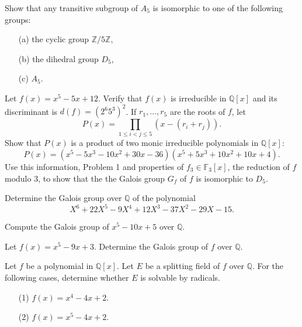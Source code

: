 \begin{prob}[S2019-Q1]
    Show that any transitive subgroup of \(A_{5}\) is isomorphic to one of the following groups:
    \begin{itemize}
        \item[(a)] the cyclic group \(\mathbb{Z}/5\mathbb{Z}\),
        \item[(b)] the dihedral group \(D_{5}\),
        \item[(c)] \(A_{5}\).
    \end{itemize}
\end{prob}


\begin{prob}[S2019-Q2]
    Let \(f(x)=x^{5}-5x+12\). Verify that \(f(x)\) is irreducible in \(\mathbb{Q}[x]\) and its discriminant is \(d(f)=(2^{6}5^{3})^{2}\). If \(r_{1},\ldots,r_{5}\) are the roots of \(f\), let
    \[P(x)=\prod_{1\leq i<j\leq 5}(x-(r_{i}+r_{j})).\]
    Show that \(P(x)\) is a product of two monic irreducible polynomials in \(\mathbb{Q}[x]\):
    \[P(x)=(x^{5}-5x^{3}-10x^{2}+30x-36)(x^{5}+5x^{3}+10x^{2}+10x+4).\]
    Use this information, Problem 1 and properties of \(f_{3}\in\mathbb{F}_{3}[x]\), the reduction of \(f\) modulo 3, to show that the the Galois group \(G_{f}\) of \(f\) is isomorphic to \(D_{5}\).
\end{prob}


\begin{prob}[F2018-Q6]
    Determine the Galois group over \(\mathbb{Q}\) of the polynomial
    \[X^{6}+22X^{5}-9X^{4}+12X^{3}-37X^{2}-29X-15.\]
\end{prob}

\begin{prob}[F2017-Q4]
    Compute the Galois group of \(x^{5}-10x+5\) over \(\mathbb{Q}\).
\end{prob}


\begin{prob}[F2004-Q3]
    Let \(f(x) = x^5 - 9x + 3\). Determine the Galois group of \(f\) over \(\mathbb{Q}\).
\end{prob}

\begin{prob}[F2006-Q2]
    Let \(f\) be a polynomial in \(\mathbb{Q}[x]\). Let \(E\) be a splitting field of \(f\) over \(\mathbb{Q}\). For the following cases, determine whether \(E\) is solvable by radicals.
    \begin{itemize}
        \item[(1)] \(f(x) = x^4 - 4x + 2\).
        \item[(2)] \(f(x) = x^5 - 4x + 2\).
    \end{itemize}
\end{prob}

